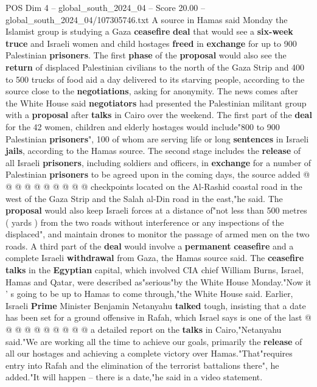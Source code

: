 \begin{textsample}{POS Dim 4 – global\_south\_2024\_04 – Score 20.00 – global\_south\_2024\_04/107305746.txt}  \label{ex:f4_pos_267}
A source in Hamas said Monday the Islamist group is studying a Gaza \textbf{ceasefire} \textbf{deal} that would see a \textbf{six-week} \textbf{truce} and Israeli women and child hostages \textbf{freed} in \textbf{exchange} for up to 900 Palestinian \textbf{prisoners}.
The first \textbf{phase} of the \textbf{proposal} would also see the \textbf{return} of displaced Palestinian civilians to the north of the Gaza Strip and 400 to 500 trucks of food aid a day delivered to its starving people, according to the source close to the \textbf{negotiations}, asking for anonymity.
The news comes after the White House said \textbf{negotiators} had presented the Palestinian militant group with a \textbf{proposal} after \textbf{talks} in Cairo over the weekend.
The first part of the \textbf{deal} for the 42 women, children and elderly hostages would include"800 to 900 Palestinian \textbf{prisoners}", 100 of whom are serving life or long \textbf{sentences} in Israeli \textbf{jails}, according to the Hamas source.
The second stage includes the \textbf{release} of all Israeli \textbf{prisoners}, including soldiers and officers, in \textbf{exchange} for a number of Palestinian \textbf{prisoners} to be agreed upon in the coming days, the source added @ @ @ @ @ @ @ @ @ @ checkpoints located on the Al-Rashid coastal road in the west of the Gaza Strip and the Salah al-Din road in the east,"he said.
The \textbf{proposal} would also keep Israeli forces at a distance of"not less than 500 metres ( yards ) from the two roads without interference or any inspections of the displaced", and maintain drones to monitor the passage of armed men on the two roads.
A third part of the \textbf{deal} would involve a \textbf{permanent} \textbf{ceasefire} and a complete Israeli \textbf{withdrawal} from Gaza, the Hamas source said.
The \textbf{ceasefire} \textbf{talks} in the \textbf{Egyptian} capital, which involved CIA chief William Burns, Israel, Hamas and Qatar, were described as"serious"by the White House Monday."Now it ' s going to be up to Hamas to come through,"the White House said.
Earlier, Israeli \textbf{Prime} Minister Benjamin Netanyahu \textbf{talked} tough, insisting that a date has been set for a ground offensive in Rafah, which Israel says is one of the last @ @ @ @ @ @ @ @ @ @ a detailed report on the \textbf{talks} in Cairo,"Netanyahu said."We are working all the time to achieve our goals, primarily the \textbf{release} of all our hostages and achieving a complete victory over Hamas."That"requires entry into Rafah and the elimination of the terrorist battalions there", he added."It will happen -- there is a date,"he said in a video statement.

\end{textsample}
